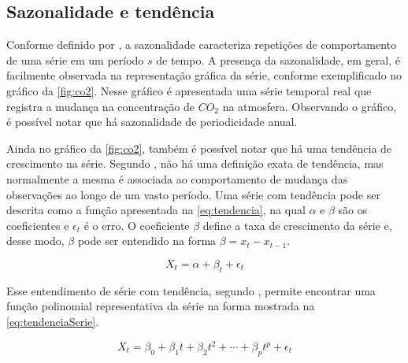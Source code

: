 \documentclass[
    12pt,
    oneside,
    a4paper,
    english,
    brazil
]{abntex2}
\begin{document}

\subsection{Sazonalidade e tendência}

Conforme definido por , a sazonalidade caracteriza repetições de comportamento de uma série em um período $s$ de tempo. A presença da sazonalidade, em geral, é
facilmente observada na representação gráfica da série, conforme exemplificado no gráfico da \autoref{fig:co2}. Nesse gráfico é apresentada uma série temporal real que registra a mudança na concentração de $CO_2$ na atmosfera. Observando o gráfico, é possível notar que há sazonalidade de periodicidade anual.

Ainda no gráfico da \autoref{fig:co2}, também é possível notar que há uma tendência de crescimento na série. Segundo , não há uma definição exata de tendência, mas normalmente a mesma é associada ao comportamento de mudança das observações ao longo de um vasto período. 
Uma série com tendência pode ser descrita como a função
apresentada na \autoref{eq:tendencia}, na qual $\alpha$ e $\beta$ são os coeficientes %
e $\epsilon_t$ é o erro. O coeficiente $\beta$ define a taxa de crescimento da série e, desse modo, $\beta$ pode ser entendido na forma $\beta = x_t - x_{t-1}$.

\begin{equation}
    \label{eq:tendencia} X_t = \alpha + \beta_t + \epsilon_t
\end{equation}

Esse entendimento de série com tendência, segundo , permite encontrar uma função polinomial representativa da série na forma mostrada na \autoref{eq:tendenciaSerie}.

\begin{equation}
    \label{eq:tendenciaSerie}
    X_t = \beta_0 + \beta_1t + \beta_2t^2 + \cdots + \beta_{p}t^p + \epsilon_t
\end{equation}
\end{document}

